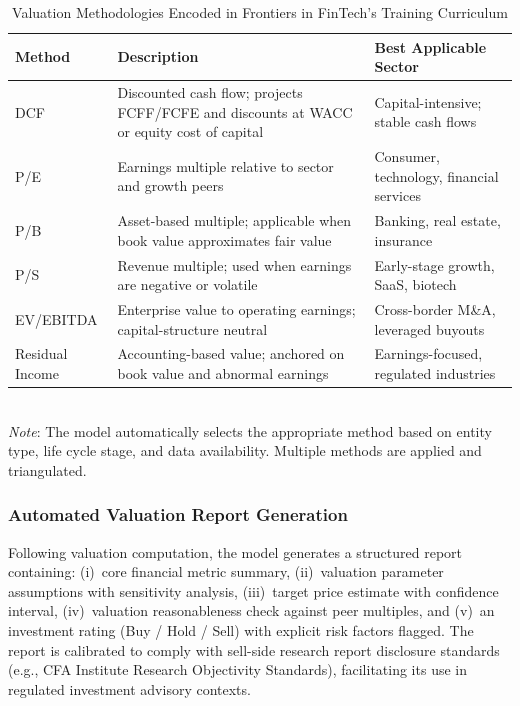 \documentclass[12pt,letterpaper]{article}
\begin{document}
\begin{table}[htbp]
  \singlespacing
  \centering
  \caption{Valuation Methodologies Encoded in Frontiers in FinTech's Training Curriculum}
  \label{tab:valuation}
  \begin{tabular}{@{}lp{5.2cm}p{5.2cm}@{}}
    \toprule
    \textbf{Method} & \textbf{Description}
      & \textbf{Best Applicable Sector} \\
    \midrule
    DCF
      & Discounted cash flow; projects FCFF/FCFE and discounts
        at WACC or equity cost of capital
      & Capital-intensive; stable cash flows \\
    \addlinespace
    P/E
      & Earnings multiple relative to sector and growth peers
      & Consumer, technology, financial services \\
    \addlinespace
    P/B
      & Asset-based multiple; applicable when book value approximates
        fair value
      & Banking, real estate, insurance \\
    \addlinespace
    P/S
      & Revenue multiple; used when earnings are negative or volatile
      & Early-stage growth, SaaS, biotech \\
    \addlinespace
    EV/EBITDA
      & Enterprise value to operating earnings; capital-structure neutral
      & Cross-border M\&A, leveraged buyouts \\
    \addlinespace
    Residual Income
      & Accounting-based value; anchored on book value and
        abnormal earnings
      & Earnings-focused, regulated industries \\
    \bottomrule
  \end{tabular}
  \vspace{4pt}\\
  \footnotesize\textit{Note}: The model automatically selects the appropriate
  method based on entity type, life cycle stage, and data availability.
  Multiple methods are applied and triangulated.
\end{table}

\subsubsection{Automated Valuation Report Generation}

Following valuation computation, the model generates a structured report
containing: (i)~core financial metric summary, (ii)~valuation parameter
assumptions with sensitivity analysis, (iii)~target price estimate with
confidence interval, (iv)~valuation reasonableness check against peer
multiples, and (v)~an investment rating (Buy / Hold / Sell) with explicit
risk factors flagged.
The report is calibrated to comply with sell-side research report
disclosure standards (e.g., CFA Institute Research Objectivity
Standards), facilitating its use in regulated investment advisory
contexts.
\end{document}
